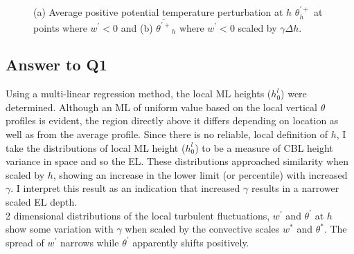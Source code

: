 \begin{figure}[htbp]
\begin{minipage}[b]{0.5\linewidth}
        \\
        \end{minipage}             
\quad
\begin{minipage}[b]{0.5\linewidth}
        \\      
       \end{minipage}
        \caption[Positive potential temperature perturbation at $h$ (ii)]{(a) Average positive potential temperature perturbation at $h$ $\theta^{\prime+}_{h}$ at points where $w^{\prime}<0$ and (b) $\overline{\theta^{\prime+}}_{h}$ where $w^{\prime}<0$ scaled by $\gamma \Delta h$.}
        \label{fig:downwarm_theta1}
\end{figure}

\subsection{Answer to Q1}

Using a multi-linear regression method, the local \acs{ML} heights ($h^{l}_{0}$) 
were determined.  Although an \acs{ML} of uniform value based on the local vertical $\theta$ profiles 
is evident, the region directly above it differs depending on location as well as from the average profile. 
Since there is no reliable, local definition of $h$, 
I take the distributions of local \acs{ML} height ($h^{l}_{0}$) to be a measure of \acs{CBL} height variance in space and so the \acs{EL}.
 These distributions approached similarity when scaled by $h$, showing an increase in the lower 
limit (or percentile) with increased $\gamma$.  I interpret this result as an indication that increased $\gamma$ results in a narrower scaled \acs{EL} depth.\\

2 dimensional distributions of the local turbulent fluctuations, $w^{'}$ and $\theta^{'}$ at $h$ show some variation with $\gamma$ when scaled by the convective scales $w^{*}$ and $\theta^{*}$.  The spread of $w^{'}$ narrows while $\theta^{'}$ apparently shifts positively.\\

